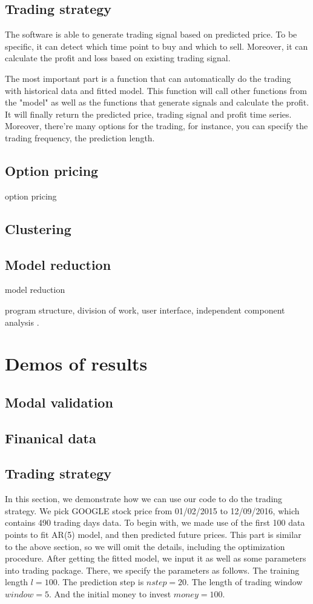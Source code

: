 \documentclass[12pt,a4paper]{article}
\begin{document}
\subsection{Trading strategy}

The software is able to generate trading signal based on predicted price. To be specific, it can detect which time point to buy and which to sell.  Moreover, it can calculate the profit and loss based on existing trading signal. 

The most important part is a function that can automatically do the trading with historical data and fitted model. This function will call other  functions from the "model" as well as the functions that generate signals and calculate the profit. It will finally return the predicted price, trading signal and profit time series. Moreover, there're many options for the trading, for instance, you can specify the trading frequency, the prediction length. 


\subsection{Option pricing}
option pricing

\subsection{Clustering}


\subsection{Model reduction}
model reduction

program structure, division of work, user interface, 
independent component analysis \cite{hyvarinen2000independent}.

\section{Demos of results}
\subsection{Modal validation}
\subsection{Finanical data}
\subsection{Trading strategy}
In this section, we demonstrate how we can use our code to do the trading strategy. We pick GOOGLE stock price from 01/02/2015 to 12/09/2016, which contains 490 trading days data. To begin with,  we made use of the first 100 data points to fit AR(5) model, and then predicted future prices. This part is similar to the above section, so we will omit the details, including the optimization procedure. After getting the fitted model, we input it as well as some parameters into trading package. There, we specify the parameters as follows. The training length $l=100$. The prediction step is $nstep=20$. The length of trading window $window=5$. And the initial money to invest $money=100$. 
\end{document}
